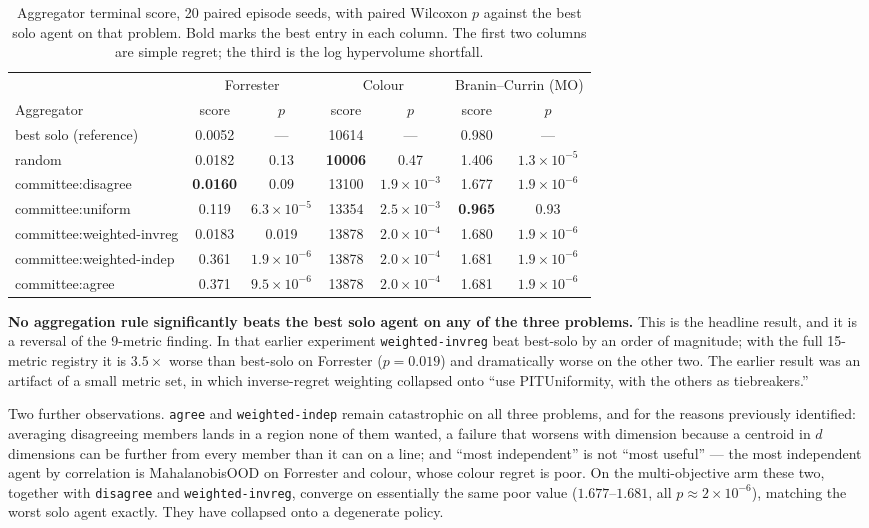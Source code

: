 \documentclass[11pt]{article}
\begin{document}
\begin{table}[H]
\centering
\small
\begin{tabular}{lcccccc}
\toprule
 & \multicolumn{2}{c}{Forrester} & \multicolumn{2}{c}{Colour} & \multicolumn{2}{c}{Branin--Currin (MO)} \\
\cmidrule(lr){2-3}\cmidrule(lr){4-5}\cmidrule(lr){6-7}
Aggregator & score & $p$ & score & $p$ & score & $p$ \\
\midrule
best solo (reference) & 0.0052 & --- & 10614 & --- & 0.980 & --- \\
random                & 0.0182 & 0.13 & \textbf{10006} & 0.47 & 1.406 & $1.3\!\times\!10^{-5}$ \\
committee:disagree    & \textbf{0.0160} & 0.09 & 13100 & $1.9\!\times\!10^{-3}$ & 1.677 & $1.9\!\times\!10^{-6}$ \\
committee:uniform     & 0.119  & $6.3\!\times\!10^{-5}$ & 13354 & $2.5\!\times\!10^{-3}$ & \textbf{0.965} & 0.93 \\
committee:weighted-invreg & 0.0183 & 0.019 & 13878 & $2.0\!\times\!10^{-4}$ & 1.680 & $1.9\!\times\!10^{-6}$ \\
committee:weighted-indep  & 0.361  & $1.9\!\times\!10^{-6}$ & 13878 & $2.0\!\times\!10^{-4}$ & 1.681 & $1.9\!\times\!10^{-6}$ \\
committee:agree       & 0.371  & $9.5\!\times\!10^{-6}$ & 13878 & $2.0\!\times\!10^{-4}$ & 1.681 & $1.9\!\times\!10^{-6}$ \\
\bottomrule
\end{tabular}
\caption{Aggregator terminal score, 20 paired episode seeds, with paired Wilcoxon $p$ against the best solo agent on that problem. Bold marks the best entry in each column. The first two columns are simple regret; the third is the log hypervolume shortfall.}
\label{tab:agg}
\end{table}

\textbf{No aggregation rule significantly beats the best solo agent on any of the three problems.} This is the headline result, and it is a reversal of the 9-metric finding. In that earlier experiment \texttt{weighted-invreg} beat best-solo by an order of magnitude; with the full 15-metric registry it is $3.5\times$ worse than best-solo on Forrester ($p = 0.019$) and dramatically worse on the other two. The earlier result was an artifact of a small metric set, in which inverse-regret weighting collapsed onto ``use PITUniformity, with the others as tiebreakers.''

Two further observations. \texttt{agree} and \texttt{weighted-indep} remain catastrophic on all three problems, and for the reasons previously identified: averaging disagreeing members lands in a region none of them wanted, a failure that worsens with dimension because a centroid in $d$ dimensions can be further from every member than it can on a line; and ``most independent'' is not ``most useful'' --- the most independent agent by correlation is MahalanobisOOD on Forrester and colour, whose colour regret is poor. On the multi-objective arm these two, together with \texttt{disagree} and \texttt{weighted-invreg}, converge on essentially the same poor value ($1.677$--$1.681$, all $p \approx 2\times10^{-6}$), matching the worst solo agent exactly. They have collapsed onto a degenerate policy.
\end{document}
